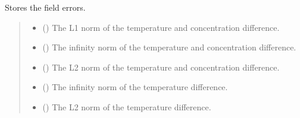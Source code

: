 \documentclass[a4paper,11pt,english,openany]{sphinxmanual}
\begin{document}
\begin{fulllineitems}
\begin{fulllineitems}
\label{\detokenize{api/spyice.postprocess.analysis:spyice.postprocess.analysis.Analysis.store_field_errors}}
\pysigstartsignatures
{}
\pysigstopsignatures
\sphinxAtStartPar
Stores the field errors.
\begin{quote}\begin{description}
\begin{itemize}
\item {} 
\sphinxAtStartPar
{} () \textendash{} The L1 norm of the temperature and concentration difference.

\item {} 
\sphinxAtStartPar
{} () \textendash{} The infinity norm of the temperature and concentration difference.

\item {} 
\sphinxAtStartPar
{} () \textendash{} The L2 norm of the temperature and concentration difference.

\item {} 
\sphinxAtStartPar
{} () \textendash{} The infinity norm of the temperature difference.

\item {} 
\sphinxAtStartPar
{} () \textendash{} The L2 norm of the temperature difference.


\end{itemize}
\end{description}
\end{quote}
\end{fulllineitems}
\end{fulllineitems}
\end{document}
